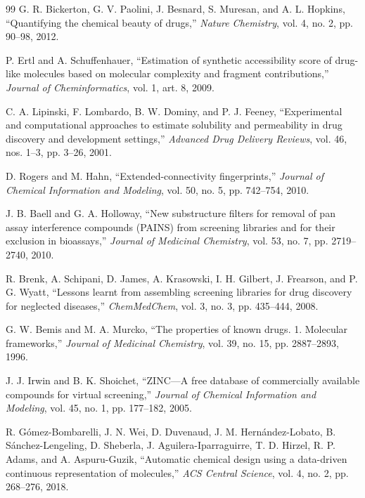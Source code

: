 \documentclass{ieeeaccess}
\begin{document}
\begin{thebibliography}{99}
G. R. Bickerton, G. V. Paolini, J. Besnard, S. Muresan, and A. L. Hopkins,
``Quantifying the chemical beauty of drugs,''
\emph{Nature Chemistry}, vol. 4, no. 2, pp. 90--98, 2012.

P. Ertl and A. Schuffenhauer,
``Estimation of synthetic accessibility score of drug-like molecules based on molecular complexity and fragment contributions,''
\emph{Journal of Cheminformatics}, vol. 1, art. 8, 2009.

C. A. Lipinski, F. Lombardo, B. W. Dominy, and P. J. Feeney,
``Experimental and computational approaches to estimate solubility and permeability in drug discovery and development settings,''
\emph{Advanced Drug Delivery Reviews}, vol. 46, nos. 1--3, pp. 3--26, 2001.

D. Rogers and M. Hahn,
``Extended-connectivity fingerprints,''
\emph{Journal of Chemical Information and Modeling}, vol. 50, no. 5, pp. 742--754, 2010.

J. B. Baell and G. A. Holloway,
``New substructure filters for removal of pan assay interference compounds (PAINS) from screening libraries and for their exclusion in bioassays,''
\emph{Journal of Medicinal Chemistry}, vol. 53, no. 7, pp. 2719--2740, 2010.

R. Brenk, A. Schipani, D. James, A. Krasowski, I. H. Gilbert, J. Frearson, and P. G. Wyatt,
``Lessons learnt from assembling screening libraries for drug discovery for neglected diseases,''
\emph{ChemMedChem}, vol. 3, no. 3, pp. 435--444, 2008.

G. W. Bemis and M. A. Murcko,
``The properties of known drugs. 1. Molecular frameworks,''
\emph{Journal of Medicinal Chemistry}, vol. 39, no. 15, pp. 2887--2893, 1996.

J. J. Irwin and B. K. Shoichet,
``ZINC---A free database of commercially available compounds for virtual screening,''
\emph{Journal of Chemical Information and Modeling}, vol. 45, no. 1, pp. 177--182, 2005.

R. G{\'o}mez-Bombarelli, J. N. Wei, D. Duvenaud, J. M. Hern{\'a}ndez-Lobato, B. S{\'a}nchez-Lengeling, D. Sheberla, J. Aguilera-Iparraguirre, T. D. Hirzel, R. P. Adams, and A. Aspuru-Guzik,
``Automatic chemical design using a data-driven continuous representation of molecules,''
\emph{ACS Central Science}, vol. 4, no. 2, pp. 268--276, 2018.


\end{thebibliography}
\end{document}
